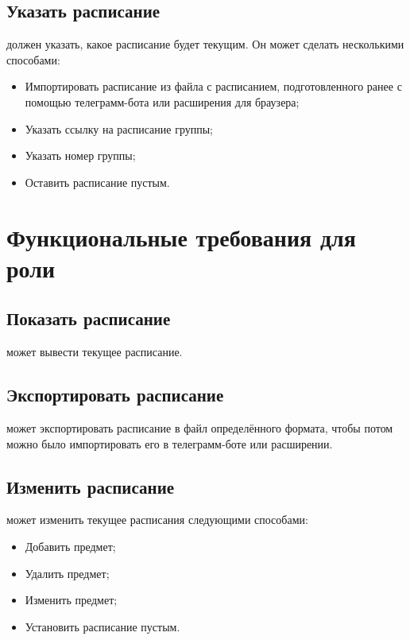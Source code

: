 		\subsection{Указать расписание}
			 должен указать, какое расписание будет текущим. Он может сделать несколькими способами:
			\begin{itemize}
				\item Импортировать расписание из файла с расписанием, подготовленного ранее с помощью телеграмм-бота или расширения для браузера;
				
				\item Указать ссылку на расписание группы;
				
				\item Указать номер группы;
				
				\item Оставить расписание пустым.
			\end{itemize}
	\section{Функциональные требования для роли }
		\subsection{Показать расписание}
			 может вывести текущее расписание.
		\subsection{Экспортировать расписание}
			 может экспортировать расписание в файл определённого формата, чтобы потом можно было импортировать его в телеграмм-боте или расширении.
		\subsection{Изменить расписание}
			 может изменить текущее расписания следующими способами:
			\begin{itemize}
				\item Добавить предмет;
				
				\item Удалить предмет;
				
				\item Изменить предмет;
				
				\item Установить расписание пустым.
			\end{itemize}
